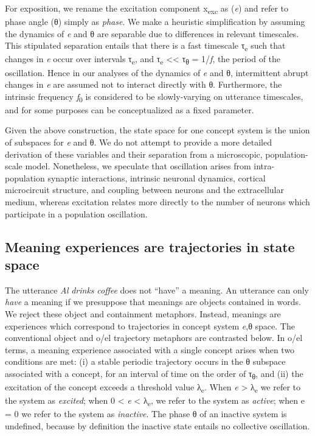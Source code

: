   For exposition, we rename the excitation component x\textsubscript{exc} as (\textit{e}) and refer to phase angle (θ) simply as \textit{phase}. We make a heuristic simplification by assuming the dynamics of \textit{e} and θ are separable due to differences in relevant timescales. This stipulated separation entails that there is a fast timescale τ\textsubscript{e} such that changes in \textit{e} occur over intervals τ\textsubscript{e}, and τ\textsubscript{e} << τ\textsubscript{θ} = 1/\textit{f}, the period of the oscillation. Hence in our analyses of the dynamics of \textit{e} and θ, intermittent abrupt changes in \textit{e} are assumed not to interact directly with θ. Furthermore, the intrinsic frequency \textit{f}\textsubscript{0} is considered to be slowly-varying on utterance timescales, and for some purposes can be conceptualized as a fixed parameter. 

  Given the above construction, the state space for one concept system is the union of subspaces for \textit{e} and θ. We do not attempt to provide a more detailed derivation of these variables and their separation from a microscopic, population-scale model. Nonetheless, we speculate that oscillation arises from intra-population synaptic interactions, intrinsic neuronal dynamics, cortical microcircuit structure, and coupling between neurons and the extracellular medium, whereas excitation relates more directly to the number of neurons which participate in a population oscillation.  

\subsection{Meaning experiences are trajectories in state space}

The utterance \textit{Al} \textit{drinks} \textit{coffee} does not “have” a meaning. An utterance can only \textit{have} a meaning if we presuppose that meanings are objects contained in words. We reject these object and containment metaphors. Instead, meanings are experiences which correspond to trajectories in concept system \textit{e},θ space. The conventional object and o/el trajectory metaphors are contrasted below. In o/el terms, a meaning experience associated with a single concept arises when two conditions are met: (i) a stable periodic trajectory occurs in the θ subspace associated with a concept, for an interval of time on the order of τ\textsubscript{θ}, and (ii) the excitation of the concept exceeds a threshold value λ\textsubscript{e}. When \textit{e} > λ\textsubscript{e} we refer to the system as \textit{excited}; when 0 < \textit{e} < λ\textsubscript{e}, we refer to the system as \textit{active}; when e = 0 we refer to the system as \textit{inactive}. The phase θ of an inactive system is undefined, because by definition the inactive state entails no collective oscillation. 


